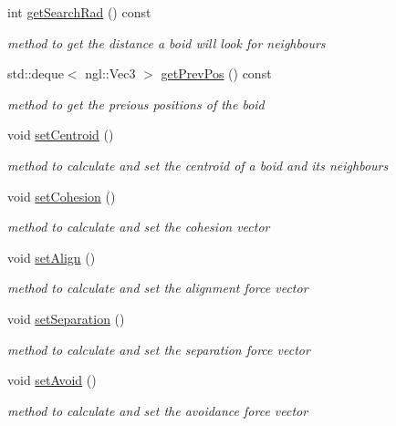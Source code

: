 \begin{DoxyCompactItemize}
int \hyperlink{classBoid_ab474ff0fa3273519a0284bda734d7119}{getSearchRad} () const 
\begin{DoxyCompactList}\small\item\em method to get the distance a boid will look for neighbours \item\end{DoxyCompactList}\item 
std::deque$<$ ngl::Vec3 $>$ \hyperlink{classBoid_a163a4e33a2c404f8796160ed3277b9b5}{getPrevPos} () const 
\begin{DoxyCompactList}\small\item\em method to get the preious positions of the boid \item\end{DoxyCompactList}\item 
void \hyperlink{classBoid_a213f06454d35d346a3d543b1b63b0272}{setCentroid} ()
\begin{DoxyCompactList}\small\item\em method to calculate and set the centroid of a boid and its neighbours \item\end{DoxyCompactList}\item 
void \hyperlink{classBoid_af0fb09a2a09da233530c37466ca1e2f2}{setCohesion} ()
\begin{DoxyCompactList}\small\item\em method to calculate and set the cohesion vector \item\end{DoxyCompactList}\item 
void \hyperlink{classBoid_a0c9548700985d099f552c0f4de7bb108}{setAlign} ()
\begin{DoxyCompactList}\small\item\em method to calculate and set the alignment force vector \item\end{DoxyCompactList}\item 
void \hyperlink{classBoid_af68e960efe0425045524acf58d681ffb}{setSeparation} ()
\begin{DoxyCompactList}\small\item\em method to calculate and set the separation force vector \item\end{DoxyCompactList}\item 
void \hyperlink{classBoid_add0e553d230a21b35c6e60d8af5f4b9a}{setAvoid} ()
\begin{DoxyCompactList}\small\item\em method to calculate and set the avoidance force vector \item\end{DoxyCompactList}\item 

\end{DoxyCompactItemize}
